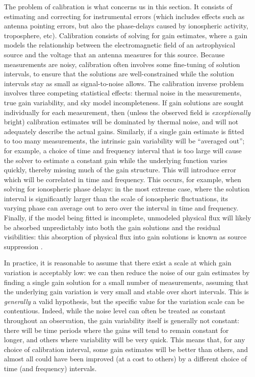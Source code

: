 \pg
The problem of calibration is what concerns us in this section. It consists of estimating and correcting for instrumental errors (which includes effects such as antenna pointing errors, but also the phase-delays caused by ionospheric activity, troposphere, etc). 
{Calibration consists of solving for gain estimates, where a gain models the relationship between the electromagnetic field of an astrophysical source and the voltage that an antenna measures for this source. Because measurements are noisy, calibration often involves some fine-tuning of solution intervals, to ensure that the solutions are well-constrained while the solution intervals stay as small as signal-to-noise allows.} The calibration inverse problem involves three competing statistical effects: thermal noise in the measurements, true gain variability, and {sky} model incompleteness. If gain solutions {are sought individually for each measurement}, then (unless the observed field is \textit{exceptionally} bright) calibration estimates will be dominated by thermal noise, and will not adequately describe the actual gains. Similarly, if a single gain estimate is fitted to too many measurements, the intrinsic gain variability will be ``averaged out''; for example, a choice of time and frequency interval that is too large will cause the solver to estimate a constant gain while the underlying function varies quickly, thereby missing much of the gain structure. This will introduce error which will be correlated in time and frequency. This occurs, for example, when solving for ionospheric phase delays: in the most extreme case, where the solution interval is significantly larger than the scale of ionospheric fluctuations, its varying phase can average out to zero over the interval in time and frequency. Finally, if the model being fitted is incomplete, unmodeled physical flux will likely be absorbed unpredictably into both the gain solutions and the residual visibilities: this absorption of physical flux into gain solutions is known as source suppression \citep[see][and references therein]{2014MNRAS.439.4030G,2013MNRAS.435..597K}.

\pg

In practice, it is reasonable to assume that there exist a scale at which gain variation is acceptably low: we can then reduce the noise of our gain estimates by finding a single gain solution for a small number of measurements, assuming that the underlying gain variation is very small and stable over short intervals. This is \emph{generally} a valid hypothesis, but the specific value for the variation scale can be contentious. Indeed, while the noise level can often be treated as constant throughout an observation, the gain variability itself is generally not constant: there will be time periods where the gains will tend to remain constant for longer, and others where variability will be very quick. This means that, for any choice of calibration interval, some gain estimates will be better than others, and almost all could have been improved (at a cost to others) by a different choice of time (and frequency) intervals. 

